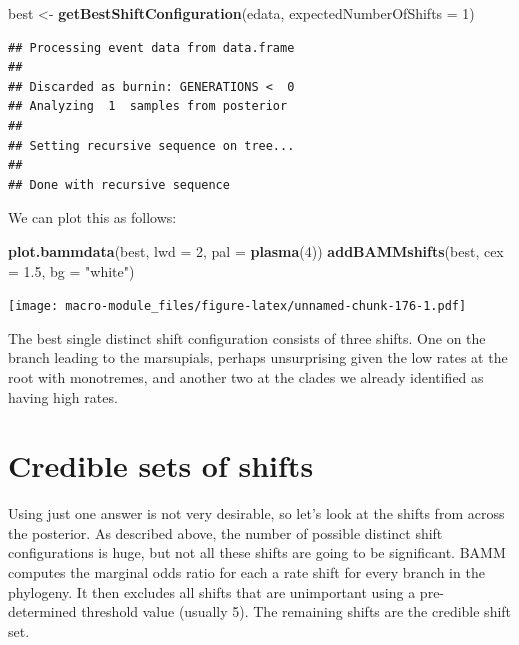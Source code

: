 \documentclass[]{book}
\newenvironment{Shaded}{\begin{snugshade}}{\end{snugshade}}
\newcommand{\KeywordTok}[1]{\textcolor[rgb]{0.13,0.29,0.53}{\textbf{{#1}}}}
\newcommand{\DataTypeTok}[1]{\textcolor[rgb]{0.13,0.29,0.53}{{#1}}}
\newcommand{\DecValTok}[1]{\textcolor[rgb]{0.00,0.00,0.81}{{#1}}}
\newcommand{\FloatTok}[1]{\textcolor[rgb]{0.00,0.00,0.81}{{#1}}}
\newcommand{\StringTok}[1]{\textcolor[rgb]{0.31,0.60,0.02}{{#1}}}
\newcommand{\NormalTok}[1]{{#1}}
\begin{document}
\begin{Shaded}
\begin{Highlighting}[]
\NormalTok{best <-}\StringTok{ }\KeywordTok{getBestShiftConfiguration}\NormalTok{(edata, }\DataTypeTok{expectedNumberOfShifts =} \DecValTok{1}\NormalTok{)}
\end{Highlighting}
\end{Shaded}

\begin{verbatim}
## Processing event data from data.frame
## 
## Discarded as burnin: GENERATIONS <  0
## Analyzing  1  samples from posterior
## 
## Setting recursive sequence on tree...
## 
## Done with recursive sequence
\end{verbatim}

We can plot this as follows:

\begin{Shaded}
\begin{Highlighting}[]
\KeywordTok{plot.bammdata}\NormalTok{(best, }\DataTypeTok{lwd =} \DecValTok{2}\NormalTok{, }\DataTypeTok{pal =} \KeywordTok{plasma}\NormalTok{(}\DecValTok{4}\NormalTok{))}
\KeywordTok{addBAMMshifts}\NormalTok{(best, }\DataTypeTok{cex =} \FloatTok{1.5}\NormalTok{, }\DataTypeTok{bg =} \StringTok{"white"}\NormalTok{)}
\end{Highlighting}
\end{Shaded}

\texttt{[image: macro-module\_files/figure-latex/unnamed-chunk-176-1.pdf]}

The best single distinct shift configuration consists of three shifts.
One on the branch leading to the marsupials, perhaps unsurprising given
the low rates at the root with monotremes, and another two at the clades
we already identified as having high rates.

\section{Credible sets of shifts}\label{credible-sets-of-shifts}

Using just one answer is not very desirable, so let's look at the shifts
from across the posterior. As described above, the number of possible
distinct shift configurations is huge, but not all these shifts are
going to be significant. BAMM computes the marginal odds ratio for each
a rate shift for every branch in the phylogeny. It then excludes all
shifts that are unimportant using a pre-determined threshold value
(usually 5). The remaining shifts are the credible shift set.
\end{document}
